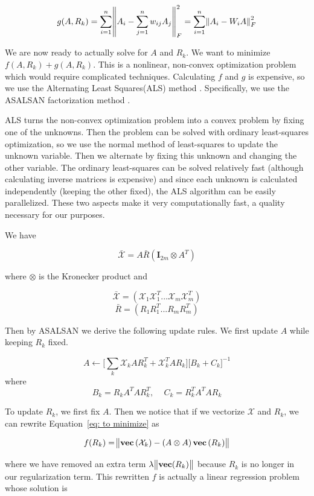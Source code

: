 \documentclass[pageno]{final_paper}
\begin{document}
\begin{equation}
    \label{eq: new g}
    g(A, R_k) = \sum_{i=1}^n \norm{A_i - \sum_{j=1}^n w_{ij}A_j}_F^2 =
    \sum_{i=1}^n \norm{A_i - W_iA}_F^2
\end{equation}

We are now ready to actually solve for $A$ and $R_k$. We want to minimize $f(A,
R_k) + g(A, R_k)$. This is a nonlinear, non-convex optimization problem which
would require complicated techniques. Calculating $f$ and $g$ is expensive, so
we use the Alternating Least Squares(ALS) method \cite{Koren2009}. Specifically,
we use the ASALSAN factorization method \cite{Bader2007}.

ALS turns the non-convex optimization problem into a convex problem by fixing
one of the unknowns. Then the problem can be solved with ordinary least-squares
optimization, so we use the normal method of least-squares to update the unknown
variable. Then we alternate by fixing this unknown and changing the other
variable. The ordinary least-squares can be solved relatively fast (although
calculating inverse matrices is expensive) and since each unknown is calculated
independently (keeping the other fixed), the ALS algorithm can be easily
parallelized. These two aspects make it very computationally fast, a quality
necessary for our purposes.

We have

$$\bar{\mathcal{X}} = A\bar{R}(\mathbf{I}_{2m} \otimes A^T)$$

where $\otimes$ is the Kronecker product and

$$\bar{\mathcal{X}} = \left( \mathcal{X}_1\mathcal{X}_1^T ... \mathcal{X}_m\mathcal{X}_m^T \right)$$
$$\bar{R} = \left( R_1 R_1^T ... R_mR_m^T \right)$$

Then by ASALSAN we derive the following update rules. We first update $A$ while
keeping $R_k$ fixed.

$$A \leftarrow \bigg[ \sum_k \mathcal{X}_kAR_k^T + \mathcal{X}_k^TAR_k \bigg] \bigg[ B_k + C_k \bigg]^{-1}$$
where
$$B_k = R_k A^T AR_k^T,\,\,\,\,\,\,\, C_k = R_k^TA^TAR_k$$

To update $R_k$, we first fix $A$. Then we notice that if we vectorize
$\mathcal{X}$ and $R_k$, we can rewrite Equation~\eqref{eq: to minimize} as

$$f(R_k) = \norm{\textbf{vec}\left(\mathcal{X}_k\right) - \left(A \otimes A \right)
\textbf{vec}\left(R_k\right)}$$

where we have removed an extra term $\lambda \norm{\textbf{vec}(R_k)}$ because
$R_k$ is no longer in our regularization term. This rewritten $f$ is actually
a linear regression problem whose solution is
\end{document}
